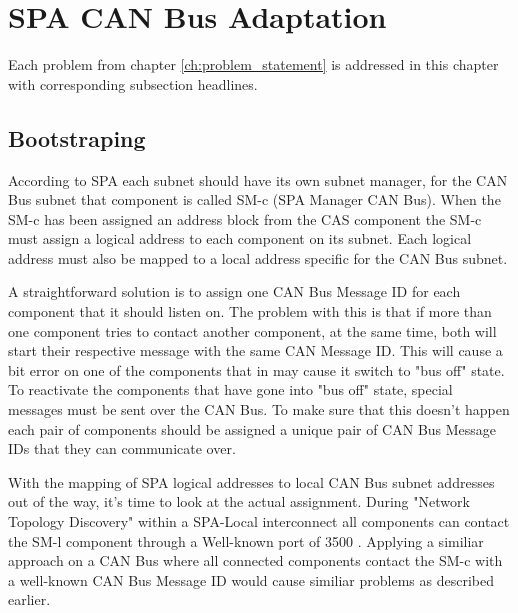\section{SPA CAN Bus Adaptation}
Each problem from chapter \ref{ch:problem_statement} is addressed in this
chapter with corresponding subsection headlines.

\subsection{Bootstraping}
According to SPA each subnet should have its own subnet manager, for the CAN Bus
subnet that component is called SM-c (SPA Manager CAN Bus). When the SM-c has
been assigned an address block from the CAS component the SM-c must assign a
logical address to each component on its subnet. Each logical address must also
be mapped to a local address specific for the CAN Bus subnet.

A straightforward solution is to assign one CAN Bus Message ID for each
component that it should listen on. The problem with this is that if more than
one component tries to contact another component, at the same time, both will
start their respective message with the same CAN Message ID. This will cause
a bit error on one of the components that in may cause it switch to "bus off" state. To
reactivate the components that have gone into "bus off" state, special messages
must be sent over the CAN Bus. To make sure that this doesn't happen each pair
of components should be assigned a unique pair of CAN Bus Message IDs that they
can communicate over.


With the mapping of SPA logical addresses to local CAN Bus subnet addresses out
of the way, it's time to look at the actual assignment. During "Network Topology
Discovery" within a SPA-Local interconnect all components can contact the SM-l
component through a Well-known port of 3500 \cite{standard:spa_local_adaptation}.
Applying a similiar approach on a CAN Bus where all connected components contact
the SM-c with a well-known CAN Bus Message ID would cause similiar problems as
described earlier.

